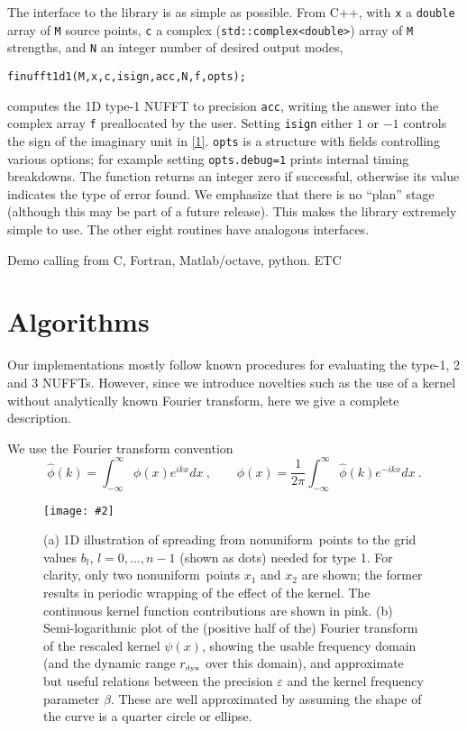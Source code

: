 \documentclass[10pt]{article}
\newcommand{\be}{\begin{equation}}
\newcommand{\ee}{\end{equation}}
\newcommand{\bfi}{\begin{figure}}
\newcommand{\efi}{\end{figure}}
\newcommand{\ca}[2]{\caption{#1 \label{#2}}}
\newcommand{\ig}[2]{\texttt{[image: \#2]}}
\newcommand{\tbox}[1]{{\mbox{\tiny #1}}}
\newcommand{\eps}{\varepsilon}
\newcommand{\intR}{\int_{-\infty}^\infty}
\newcommand{\rmax}{r_\tbox{dyn}}    %
\newcommand{\NU}{{nonuniform}}       %
\begin{document}
The interface to the library is as
simple as possible.
From C++, with {\tt x} a {\tt double} array of {\tt M} source points,
{\tt c} a complex ({\tt std::complex<double>}) array of {\tt M} strengths,
and {\tt N} an integer number of desired output modes,
\begin{verbatim}
finufft1d1(M,x,c,isign,acc,N,f,opts);
\end{verbatim}
computes the 1D type-1 NUFFT to precision {\tt acc}, writing the
answer into the complex array {\tt f} preallocated by the user.
Setting {\tt isign} either $1$ or $-1$ controls the
sign of the imaginary unit in \eqref{1}.
{\tt opts} is a structure with fields controlling various options;
for example setting {\tt opts.debug=1} prints internal timing breakdowns.
The function returns an integer zero if successful, otherwise
its value indicates the type of error found.
We emphasize that there is no ``plan'' stage
(although this may be part of a future release).
This makes the library extremely simple to use.
The other eight routines have analogous interfaces.


Demo calling from C, Fortran, Matlab/octave, python.
ETC


\section{Algorithms}

Our implementations mostly follow known procedures
for evaluating the type-1, 2 and 3 NUFFTs.
However, since we introduce novelties such as the
use of a kernel without analytically known Fourier transform,
here we give a complete description.

We use the Fourier transform convention
\be
\hat\phi(k) = \intR \phi(x) e^{ikx} dx
~,\qquad
\phi(x) = \frac{1}{2\pi} \intR \hat\phi(k) e^{-ikx} dx
~.
\label{FT}
\ee


\bfi[t]  %
\ig{width=6.5in}{spreadalias.eps}
\ca{(a) 1D illustration of spreading from \NU\ points to the grid
  values $b_l$, $l=0,\dots,n-1$ (shown as dots) needed for type 1.
  For clarity, only two \NU\ points $x_1$ and $x_2$ are shown;
  the former results in periodic wrapping of the effect of the kernel.
  The continuous kernel function contributions are shown in pink.
  (b) Semi-logarithmic plot of the (positive half of the)
  Fourier transform of the rescaled
  kernel $\psi(x)$, showing the usable frequency domain (and the
  dynamic range $\rmax$ over this domain), and approximate
  but useful relations between the precision $\eps$
  and the kernel frequency parameter $\beta$.
  These are well approximated by assuming the shape of the curve is
  a quarter circle or ellipse.
}{f:spreadalias}
\efi
\end{document}
